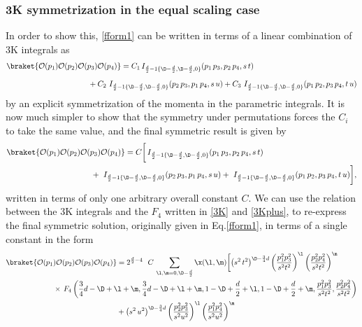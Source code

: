 \documentclass[a4paper,11pt,openright,twoside]{book}
\numberwithin{equation}{section}
\begin{document}
{\subsubsection{3K symmetrization in the equal scaling case}
In order to show this, \eqref{fform1} can be written in terms of a linear combination of 3K integrals as
\begin{align}
	\braket{\mathcal{O}(p_1)\mathcal{O}(p_2)\mathcal{O}(p_3)\mathcal{O}(p_4)}&= C_1\,I_{\frac{d}{2}-1\{\D-\frac{d}{2},\D-\frac{d}{2},0\}}(p_1\,p_3,p_2\,p_4,s\,t)\notag\\[1.2ex]
	&\hspace{-1.5cm}+C_2\, \,I_{\frac{d}{2}-1\{\D-\frac{d}{2},\D-\frac{d}{2},0\}}(p_2\,p_3,p_1\,p_4,s\,u)+C_3\, \,I_{\frac{d}{2}-1\{\D-\frac{d}{2},\D-\frac{d}{2},0\}}(p_1\,p_2,p_3\,p_4,t\,u)
\end{align}
by an explicit symmetrization of the momenta in the parametric integrals.  It is now much simpler to show that the symmetry under permutations forces the $C_i$ to take the same value, and the final symmetric result is given by
\begin{align}
	\braket{\mathcal{O}(p_1)\mathcal{O}(p_2)\mathcal{O}(p_3)\mathcal{O}(p_4)}&= C\bigg[\,I_{\frac{d}{2}-1\{\D-\frac{d}{2},\D-\frac{d}{2},0\}}(p_1\,p_3,p_2\,p_4,s\,t)\notag\\
	&\hspace{-1.5cm}+\, \,I_{\frac{d}{2}-1\{\D-\frac{d}{2},\D-\frac{d}{2},0\}}(p_2\,p_3,p_1\,p_4,s\,u)+\, \,I_{\frac{d}{2}-1\{\D-\frac{d}{2},\D-\frac{d}{2},0\}}(p_1\,p_2,p_3\,p_4,t\,u)\bigg],
\end{align}
written in terms of only one arbitrary overall constant $C$. We can use the relation between the 3K integrals and the $F_4$ written in \eqref{3K} and \eqref{3Kplus},  to re-express the final symmetric solution, originally given in Eq.\eqref{fform1}, in terms of a single constant in the form
\begin{align}
	\braket{\mathcal{O}(p_1)\mathcal{O}(p_2)\mathcal{O}(p_3)\mathcal{O}(p_4)}&=2^{\frac{d}{2}-4}\ \ C\,\sum_{\l,\m=0,\D-\frac{d}{2}}\x(\l,\m)\bigg[\big(s^2\,t^2\big)^{\D-\frac{3}{4}d}\left(\frac{p_1^2 p_3^2}{s^2 t^2}\right)^\l\left(\frac{p_2^2p_4^2}{s^2t^2}\right)^\m\nonumber\\
	&\hspace{-3cm}\times\,F_4\left(\frac{3}{4}d-\D+\l+\m,\frac{3}{4}d-\D+\l+\m,1-\D+\frac{d}{2}+\l,1-\D+\frac{d}{2}+\m,\frac{p_1^2 p_3^2}{s^2 t^2},\frac{p_2^2 p_4^2}{s^2 t^2}\right)\notag\\
	&+\big(s^2\,u^2\big)^{\D-\frac{3}{4}d}\left(\frac{p_2^2 p_3^2}{s^2 u^2}\right)^\l\left(\frac{p_1^2p_4^2}{s^2u^2}\right)^\m\notag\\

\end{align}}
\end{document}
